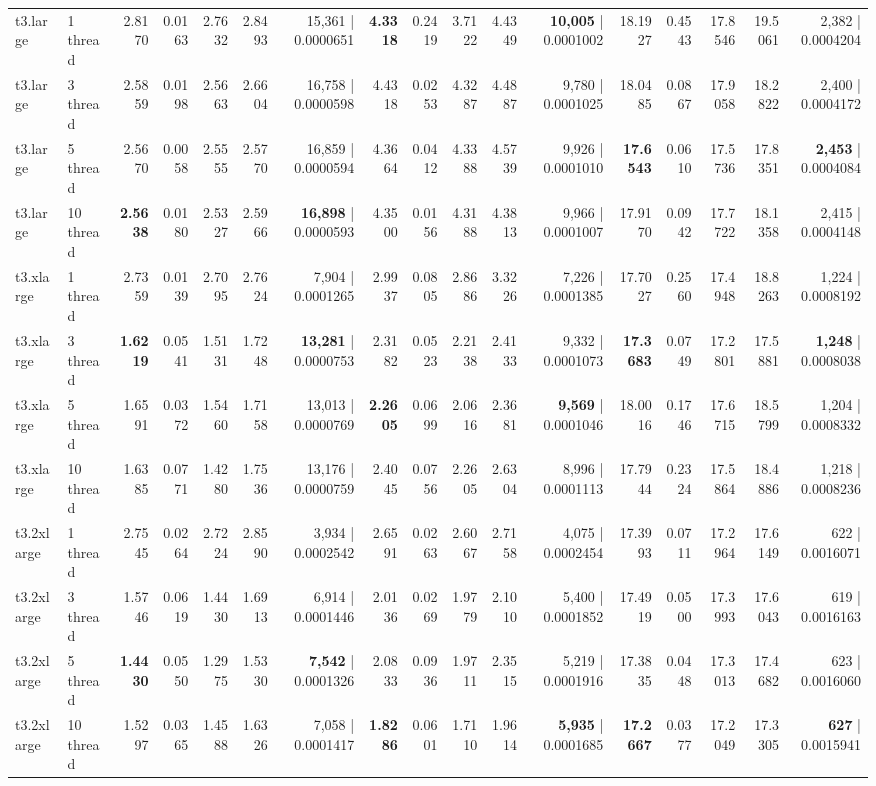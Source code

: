 \documentclass[conference]{IEEEtran}
\begin{document}
\begin{table}[h]
{\begin{tabular}{ll|rrrrr|rrrrr|rrrrr}
				t3.large & 1 thread & 2.8170 & 0.0163 & 2.7632 & 2.8493 & 15,361 | 0.0000651 & \textbf{4.3318} & 0.2419 & 3.7122 & 4.4349 & \textbf{10,005} | 0.0001002 & 18.1927 & 0.4543 & 17.8546 & 19.5061 & 2,382 | 0.0004204 \\
				t3.large & 3 thread & 2.5859 & 0.0198 & 2.5663 & 2.6604 & 16,758 | 0.0000598 & 4.4318 & 0.0253 & 4.3287 & 4.4887 & 9,780 | 0.0001025 & 18.0485 & 0.0867 & 17.9058 & 18.2822 & 2,400 | 0.0004172 \\
				t3.large & 5 thread & 2.5670 & 0.0058 & 2.5555 & 2.5770 & 16,859 | 0.0000594 & 4.3664 & 0.0412 & 4.3388 & 4.5739 & 9,926 | 0.0001010 & \textbf{17.6543} & 0.0610 & 17.5736 & 17.8351 & \textbf{2,453} | 0.0004084 \\
				t3.large & 10 thread & \textbf{2.5638} & 0.0180 & 2.5327 & 2.5966 & \textbf{16,898} | 0.0000593 & 4.3500 & 0.0156 & 4.3188 & 4.3813 & 9,966 | 0.0001007 & 17.9170 & 0.0942 & 17.7722 & 18.1358 & 2,415 | 0.0004148 \\
				\midrule
				t3.xlarge & 1 thread & 2.7359 & 0.0139 & 2.7095 & 2.7624 & 7,904 | 0.0001265 & 2.9937 & 0.0805 & 2.8686 & 3.3226 & 7,226 | 0.0001385 & 17.7027 & 0.2560 & 17.4948 & 18.8263 & 1,224 | 0.0008192 \\
				t3.xlarge & 3 thread & \textbf{1.6219} & 0.0541 & 1.5131 & 1.7248 & \textbf{13,281} | 0.0000753 & 2.3182 & 0.0523 & 2.2138 & 2.4133 & 9,332 | 0.0001073 & \textbf{17.3683} & 0.0749 & 17.2801 & 17.5881 & \textbf{1,248} | 0.0008038 \\
				t3.xlarge & 5 thread & 1.6591 & 0.0372 & 1.5460 & 1.7158 & 13,013 | 0.0000769 & \textbf{2.2605} & 0.0699 & 2.0616 & 2.3681 & \textbf{9,569} | 0.0001046 & 18.0016 & 0.1746 & 17.6715 & 18.5799 & 1,204 | 0.0008332 \\
				t3.xlarge & 10 thread & 1.6385 & 0.0771 & 1.4280 & 1.7536 & 13,176 | 0.0000759 & 2.4045 & 0.0756 & 2.2605 & 2.6304 & 8,996 | 0.0001113 & 17.7944 & 0.2324 & 17.5864 & 18.4886 & 1,218 | 0.0008236 \\
				\midrule
				t3.2xlarge & 1 thread & 2.7545 & 0.0264 & 2.7224 & 2.8590 & 3,934 | 0.0002542 & 2.6591 & 0.0263 & 2.6067 & 2.7158 & 4,075 | 0.0002454 & 17.3993 & 0.0711 & 17.2964 & 17.6149 & 622 | 0.0016071 \\
				t3.2xlarge & 3 thread & 1.5746 & 0.0619 & 1.4430 & 1.6913 & 6,914 | 0.0001446 & 2.0136 & 0.0269 & 1.9779 & 2.1010 & 5,400 | 0.0001852 & 17.4919 & 0.0500 & 17.3993 & 17.6043 & 619 | 0.0016163 \\
				t3.2xlarge & 5 thread & \textbf{1.4430} & 0.0550 & 1.2975 & 1.5330 & \textbf{7,542} | 0.0001326 & 2.0833 & 0.0936 & 1.9711 & 2.3515 & 5,219 | 0.0001916 & 17.3835 & 0.0448 & 17.3013 & 17.4682 & 623 | 0.0016060 \\
				t3.2xlarge & 10 thread & 1.5297 & 0.0365 & 1.4588 & 1.6326 & 7,058 | 0.0001417 & \textbf{1.8286} & 0.0601 & 1.7110 & 1.9614 & \textbf{5,935} | 0.0001685 & \textbf{17.2667} & 0.0377 & 17.2049 & 17.3305 & \textbf{627} | 0.0015941 \\
				\bottomrule
			\end{tabular}
		}
	\end{table}
	
\end{document}
